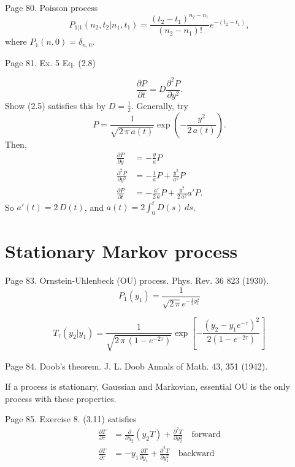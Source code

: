 \documentclass{book}
\numberwithin{equation}{section}
\theoremstyle{plain}
\theoremstyle{definition}
\theoremstyle{remark}
\begin{document}
Page 80.
Poisson process
\begin{equation}
P_{1|1}(n_2, t_2|n_1, t_1)
=
\frac{ (t_2 - t_1)^{n_2 - n_1} } { (n_2 - n_1)! }
e^{ -(t_2 - t_1) },
\tag{2.6}
\end{equation}
where
$P_1(n, 0) = \delta_{n,0}$.

Page 81. Ex. 5 Eq. (2.8)

$$
\frac{ \partial P } { \partial t }
=
D \frac{ \partial^2 P } { \partial y^2 }.
$$
Show (2.5) satisfies this by $D = \frac{1}{2}$.
Generally, try
$$
P = \frac{ 1 } { \sqrt{ 2 \, \pi \, a(t) } }
\exp\left(
  - \frac{ y^2 } { 2 \, a(t) }
\right).
$$
Then,
$$
\begin{aligned}
\frac{ \partial P } { \partial y }
&=
- \frac{ y } { a } P
\\
\frac{ \partial^2 P } { \partial y^2 }
&=
- \frac{1}{a} P
+ \frac{ y^2 } { a^2 } P
\\
\frac{ \partial P } { \partial t }
&=
-\frac{ a' } { 2 \, a } P
+ \frac{ y^2 } { 2 \, a^2 } a' P.
\end{aligned}
$$
So $a'(t) = 2 \, D(t)$,
and
$a(t) = 2 \int^t_0 D(s) \, ds$.


\section{Stationary Markov process}

Page 83.
Ornstein-Uhlenbeck (OU) process.
Phys. Rev. 36 823 (1930).
\begin{equation}
P_1(y_1)
=
\frac{1}{\sqrt{2 \, \pi} e^{-\frac 1 2 y_1^2 } }
\tag{3.10}
\end{equation}

\begin{equation}
  T_\tau(y_2 | y_1)
=
\frac{ 1 } { \sqrt{ 2 \, \pi \, (1 - e^{-2\tau}) }  }
\exp\left[
  -\frac{ (y_2 - y_1 e^{-\tau})^2 }
  { 2 ( 1 - e^{-2 \tau } ) }
\right]
\tag{3.11}
\end{equation}

Page 84.
Doob's theorem.
J. L. Doob Annals of Math. 43, 351 (1942).

If a process is stationary, Gaussian and Markovian,
essential OU is the only process with these properties.

Page 85.
Exercise 8. (3.11) satisfies
\begin{align}
\frac{ \partial T } { \partial \tau }
&=
\frac{ \partial } { \partial y_2 } \left( y_2 T \right)
+
\frac{ \partial^2 T } { \partial y_2^2 }
\quad \mathrm{forward}
\tag{3.20}
\\
\frac{ \partial T } { \partial \tau }
&=
-y_1 \frac{ \partial T } { \partial y_1 }
+
\frac{ \partial^2 T } { \partial y_1^2 }
\quad \mathrm{backward}
\tag{3.21}
\end{align}
\end{document}
